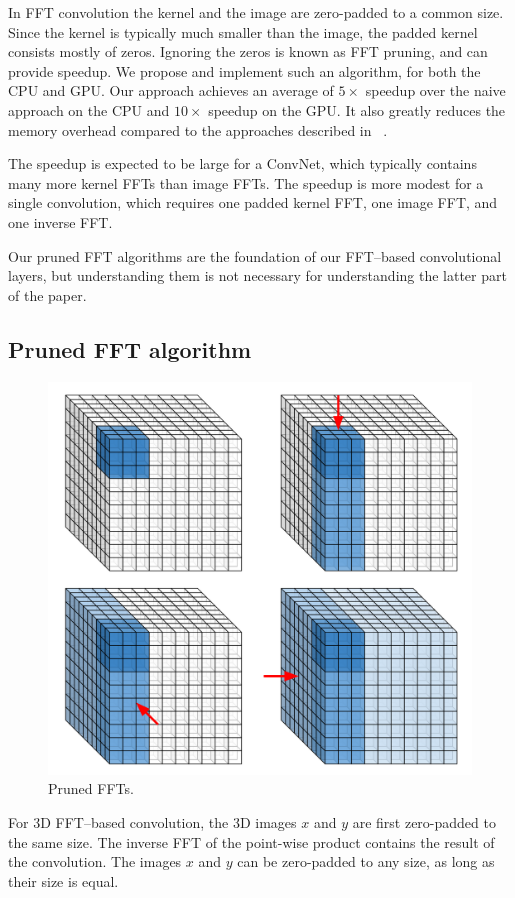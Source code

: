 \documentclass[conference]{./IEEEtran/IEEEtran}
\begin{document}
  In FFT convolution the kernel and the image are zero-padded to a
  common size.  Since the kernel is typically much smaller than the
  image, the padded kernel consists mostly of zeros.  Ignoring the
  zeros is known as FFT pruning, and can provide speedup.  We propose
  and implement such an algorithm, for both the CPU and GPU. Our
  approach achieves an average of $5 \times$ speedup over the naive
  approach on the CPU and $10 \times$ speedup on the GPU.  It also
  greatly reduces the memory overhead compared to the approaches
  described in ~\cite{mathieu-iclr-14,vasilache2014fast}.

  The speedup is expected to be large for a ConvNet, which typically
  contains many more kernel FFTs than image FFTs.  The speedup is more
  modest for a single convolution, which requires one padded kernel
  FFT, one image FFT, and one inverse FFT.

  Our pruned FFT algorithms are the foundation of our FFT--based
  convolutional layers, but understanding them is not necessary for
  understanding the latter part of the paper.

\subsection{Pruned FFT algorithm}

  \begin{figure}
    \begin{center}
      \includegraphics[width=0.55\columnwidth]{fig/pruned_ffts.pdf}
    \end{center}
    \caption{Pruned FFTs.}
    \label{fig:pruned_ffts}
  \end{figure}

  For 3D FFT--based convolution, the 3D images $x$ and $y$ are first
  zero-padded to the same size.  The inverse FFT of the point-wise
  product contains the result of the convolution.  The images $x$ and
  $y$ can be zero-padded to any size, as long as their size is equal.
\end{document}
